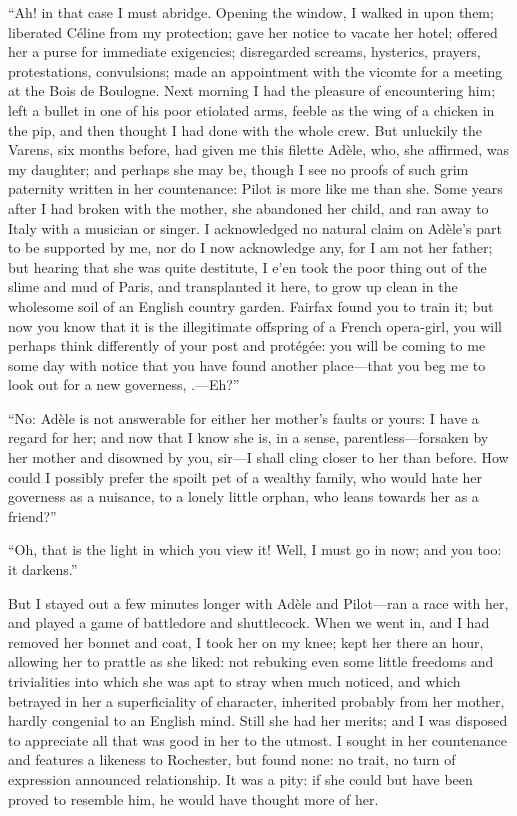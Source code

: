 \enquote{Ah! in that case I must abridge. Opening the window, I walked
	in upon them; liberated Céline from my protection; gave her notice to
	vacate her hotel; offered her a purse for immediate exigencies;
	disregarded screams, hysterics, prayers, protestations, convulsions;
	made an appointment with the vicomte for a meeting at the Bois de
	Boulogne. Next morning I had the pleasure of encountering him; left a
	bullet in one of his poor etiolated arms, feeble as the wing of a
	chicken in the pip, and then thought I had done with the whole crew.
	But unluckily the Varens, six months before, had given me this filette
	Adèle, who, she affirmed, was my daughter; and perhaps she may be,
	though I see no proofs of such grim paternity written in her
	countenance: Pilot is more like me than she. Some years after I had
	broken with the mother, she abandoned her child, and ran away to Italy
	with a musician or singer. I acknowledged no natural claim on Adèle's
	part to be supported by me, nor do I now acknowledge any, for I am not
	her father; but hearing that she was quite destitute, I e'en took the
	poor thing out of the slime and mud of Paris, and transplanted it here,
	to grow up clean in the wholesome soil of an English country garden.
	\Mrs{} Fairfax found you to train it; but now you know that it is the
	illegitimate offspring of a French opera-girl, you will perhaps think
	differently of your post and protégée: you will be coming to me some day
	with notice that you have found another place---that you beg me to look
	out for a new governess, \etc.---Eh?}

\enquote{No: Adèle is not answerable for either her mother's faults or
	yours: I have a regard for her; and now that I know she is, in a sense,
	parentless---forsaken by her mother and disowned by you, sir---I shall
	cling closer to her than before. How could I possibly prefer the spoilt
	pet of a wealthy family, who would hate her governess as a nuisance, to
	a lonely little orphan, who leans towards her as a friend?}

\enquote{Oh, that is the light in which you view it! Well, I must go in
	now; and you too: it darkens.}

But I stayed out a few minutes longer with Adèle and Pilot---ran a race
with her, and played a game of battledore and shuttlecock. When we went
in, and I had removed her bonnet and coat, I took her on my knee; kept
her there an hour, allowing her to prattle as she liked: not rebuking
even some little freedoms and trivialities into which she was apt to
stray when much noticed, and which betrayed in her a superficiality of
character, inherited probably from her mother, hardly congenial to an
English mind. Still she had her merits; and I was disposed to
appreciate all that was good in her to the utmost. I sought in her
countenance and features a likeness to \Mr{} Rochester, but found none: no
trait, no turn of expression announced relationship. It was a pity: if
she could but have been proved to resemble him, he would have thought
more of her.


